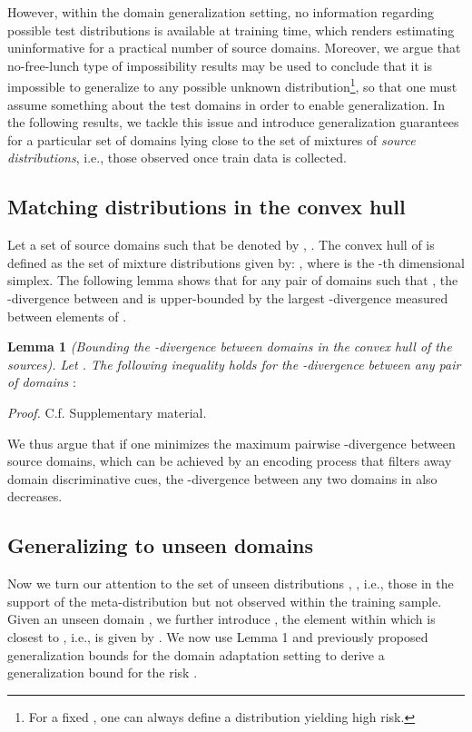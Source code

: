 \documentclass{article}
\begin{document}
However, within the domain generalization setting, no information regarding possible test distributions is available at training time, which renders estimating  uninformative for a practical number of source domains. Moreover, we argue that no-free-lunch type of impossibility results may be used to conclude that it is impossible to generalize to any possible unknown distribution\footnote{For a fixed , one can always define a distribution yielding high risk.}, so that one must assume something about the test domains in order to enable generalization. In the following results, we tackle this issue and introduce generalization guarantees for a particular set of domains lying close to the set of mixtures of \emph{source distributions}, i.e., those observed once train data is collected.




\subsection{Matching distributions in the convex hull}
Let a set  of source domains such that  be denoted by , . The convex hull  of  is defined as the set of mixture distributions given by: , where  is the -th dimensional simplex. The following lemma shows that for any pair of domains such that , the -divergence between  and  is upper-bounded by the largest -divergence measured between elements of .

\textbf{Lemma 1} \textit{(Bounding the -divergence between domains in the convex hull of the sources). Let . The following inequality holds for the -divergence between any pair of domains }:


\textit{Proof.} C.f. Supplementary material. 

We thus argue that if one minimizes the maximum pairwise -divergence between source domains, which can be achieved by an encoding process that filters away domain discriminative cues, the -divergence between any two domains in  also decreases. 

\subsection{Generalizing to unseen domains}
Now we turn our attention to the set of unseen distributions , , i.e., those in the support of the meta-distribution but not observed within the training sample. Given an unseen domain , we further introduce , the element within  which is closest to  , i.e.,   is given by . 
We now use Lemma 1 and previously proposed generalization bounds for the domain adaptation setting \cite{zhao2018adversarial, zhao2019learning} to derive a generalization bound for the risk . 
\end{document}
